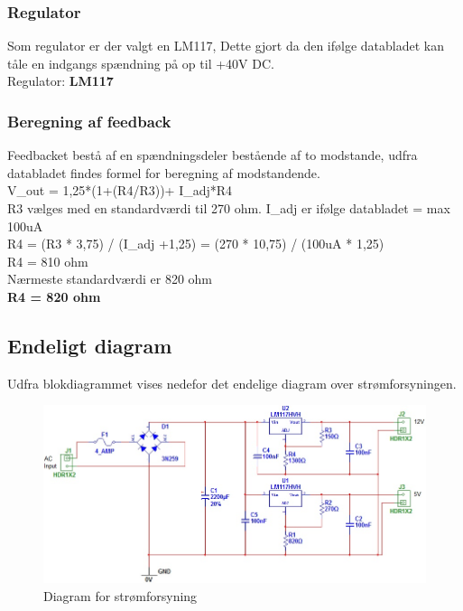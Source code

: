 \subsubsection{Regulator}
Som regulator er der valgt en LM117, Dette gjort da den ifølge databladet kan tåle en indgangs spændning på op til +40V DC. \\
Regulator: \textbf{LM117}
\subsubsection{Beregning af feedback}
Feedbacket bestå af en spændningsdeler bestående af to modstande, udfra databladet findes formel for beregning af modstandende. \\
V\_out = 1,25*(1+(R4/R3))+ I\_adj*R4 \\
R3 vælges med en standardværdi til 270 ohm. I\_adj er ifølge databladet = max 100uA \\
R4 = (R3 * 3,75) / (I\_adj +1,25) = (270 * 10,75) / (100uA * 1,25) \\
R4 = 810 ohm \\
Nærmeste standardværdi er 820 ohm \\
\textbf{R4 = 820 ohm}
\newpage
\subsection{Endeligt diagram}
Udfra blokdiagrammet vises nedefor det endelige diagram over strømforsyningen.
\begin{figure}[H]
\centering
\includegraphics[scale=0.7]{billeder/final_power}
\caption{Diagram for strømforsyning}
\label{fig:Dia_finalpower}
\end{figure}

